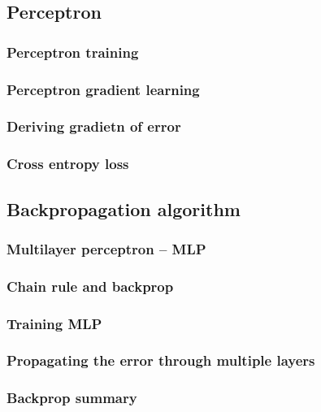 \documentclass[12pt, letterpaper]{article}
\begin{document}
\subsection{Perceptron}

\subsubsection{Perceptron training}

\subsubsection{Perceptron gradient learning}

\subsubsection{Deriving gradietn of error}

\subsubsection{Cross entropy loss}


\subsection{Backpropagation algorithm}

\subsubsection{Multilayer perceptron – MLP}

\subsubsection{Chain rule and backprop}

\subsubsection{Training MLP}

\subsubsection{Propagating the error through multiple layers}

\subsubsection{Backprop summary}
\end{document}
